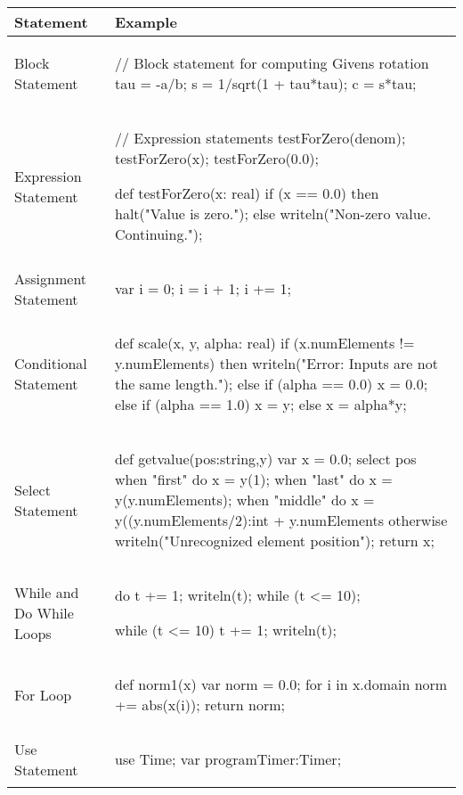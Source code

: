 \begin{center}
\begin{longtable}{|l|l|}
\hline
{\bf Statement} & {\bf Example} \\
\hline
\endhead
\hline
\endfoot
Block Statement &
\begin{chapel} %
// Block statement for computing Givens rotation
{
tau = -a/b;
s = 1/sqrt(1 + tau*tau);
c = s*tau;
}
\end{chapel} \\
\hline
Expression Statement & 
\begin{chapel} %

// Expression statements
testForZero(denom);
testForZero(x);
testForZero(0.0);

def testForZero(x: real) {
  if (x == 0.0) then halt("Value is zero.");
  else writeln("Non-zero value.  Continuing.");   
}
\end{chapel} \\
\hline
Assignment Statement & 
\begin{chapel} %

var i = 0;
i = i + 1;
i += 1;
\end{chapel} \\
\hline
Conditional Statement &
\begin{chapel} %
def scale(x, y, alpha: real) {
  if (x.numElements != y.numElements) then
    writeln("Error:  Inputs are not the same length.");
  else {
    if (alpha == 0.0) {
      x = 0.0;
    } else if (alpha == 1.0) {
      x = y;
    } else {
      x = alpha*y;
    }
  }
}
\end{chapel} \\
\hline
Select Statement &
\begin{chapel} %
def getvalue(pos:string,y) {
  var x = 0.0;
  select pos {
    when "first" do x = y(1);
    when "last" do x = y(y.numElements);
    when "middle" do x = y((y.numElements/2):int + y.numElements%
    otherwise writeln("Unrecognized element position");
  }
  return x;
}
\end{chapel} \\
\hline
While and Do While Loops &
\begin{chapel} %
do {
  t += 1;
  writeln(t);
} while (t <= 10);

while (t <= 10) {
  t += 1;
  writeln(t);
}
\end{chapel} \\
\hline
For Loop &
\begin{chapel} %
def norm1(x) {
  var norm = 0.0;
  for i in x.domain {
    norm += abs(x(i));
  }
  return norm;
}
\end{chapel} \\
\hline
Use Statement &
\begin{chapel} %
use Time;
var programTimer:Timer;


\end{chapel}
\end{longtable}
\end{center}
